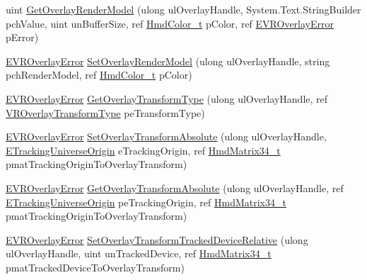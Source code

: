 \begin{DoxyCompactItemize}
\item 
uint \mbox{\hyperlink{class_valve_1_1_v_r_1_1_c_v_r_overlay_a71e8c48ef4e3a00ce3dd2795806407e3}{Get\+Overlay\+Render\+Model}} (ulong ul\+Overlay\+Handle, System.\+Text.\+String\+Builder pch\+Value, uint un\+Buffer\+Size, ref \mbox{\hyperlink{struct_valve_1_1_v_r_1_1_hmd_color__t}{Hmd\+Color\+\_\+t}} p\+Color, ref \mbox{\hyperlink{namespace_valve_1_1_v_r_aaee5c5144f42b7969d45b854f51b0c18}{E\+V\+R\+Overlay\+Error}} p\+Error)
\item 
\mbox{\hyperlink{namespace_valve_1_1_v_r_aaee5c5144f42b7969d45b854f51b0c18}{E\+V\+R\+Overlay\+Error}} \mbox{\hyperlink{class_valve_1_1_v_r_1_1_c_v_r_overlay_a6bb90e328dc2817d2c27f697c7f8e2bc}{Set\+Overlay\+Render\+Model}} (ulong ul\+Overlay\+Handle, string pch\+Render\+Model, ref \mbox{\hyperlink{struct_valve_1_1_v_r_1_1_hmd_color__t}{Hmd\+Color\+\_\+t}} p\+Color)
\item 
\mbox{\hyperlink{namespace_valve_1_1_v_r_aaee5c5144f42b7969d45b854f51b0c18}{E\+V\+R\+Overlay\+Error}} \mbox{\hyperlink{class_valve_1_1_v_r_1_1_c_v_r_overlay_aa02ca92f757e30beca7ac9ded8f6472a}{Get\+Overlay\+Transform\+Type}} (ulong ul\+Overlay\+Handle, ref \mbox{\hyperlink{namespace_valve_1_1_v_r_a92803c040c9ae49e1263b22b4d57d5fb}{V\+R\+Overlay\+Transform\+Type}} pe\+Transform\+Type)
\item 
\mbox{\hyperlink{namespace_valve_1_1_v_r_aaee5c5144f42b7969d45b854f51b0c18}{E\+V\+R\+Overlay\+Error}} \mbox{\hyperlink{class_valve_1_1_v_r_1_1_c_v_r_overlay_a8a03e164747126f2bd2bf28b5f0f1775}{Set\+Overlay\+Transform\+Absolute}} (ulong ul\+Overlay\+Handle, \mbox{\hyperlink{namespace_valve_1_1_v_r_a29be99a3c2f780157bd490db06a7f12f}{E\+Tracking\+Universe\+Origin}} e\+Tracking\+Origin, ref \mbox{\hyperlink{struct_valve_1_1_v_r_1_1_hmd_matrix34__t}{Hmd\+Matrix34\+\_\+t}} pmat\+Tracking\+Origin\+To\+Overlay\+Transform)
\item 
\mbox{\hyperlink{namespace_valve_1_1_v_r_aaee5c5144f42b7969d45b854f51b0c18}{E\+V\+R\+Overlay\+Error}} \mbox{\hyperlink{class_valve_1_1_v_r_1_1_c_v_r_overlay_a5108e385210ae62c370ceecbe62f6aae}{Get\+Overlay\+Transform\+Absolute}} (ulong ul\+Overlay\+Handle, ref \mbox{\hyperlink{namespace_valve_1_1_v_r_a29be99a3c2f780157bd490db06a7f12f}{E\+Tracking\+Universe\+Origin}} pe\+Tracking\+Origin, ref \mbox{\hyperlink{struct_valve_1_1_v_r_1_1_hmd_matrix34__t}{Hmd\+Matrix34\+\_\+t}} pmat\+Tracking\+Origin\+To\+Overlay\+Transform)
\item 
\mbox{\hyperlink{namespace_valve_1_1_v_r_aaee5c5144f42b7969d45b854f51b0c18}{E\+V\+R\+Overlay\+Error}} \mbox{\hyperlink{class_valve_1_1_v_r_1_1_c_v_r_overlay_aa959512be1624a75d9e44db50e20dcb3}{Set\+Overlay\+Transform\+Tracked\+Device\+Relative}} (ulong ul\+Overlay\+Handle, uint un\+Tracked\+Device, ref \mbox{\hyperlink{struct_valve_1_1_v_r_1_1_hmd_matrix34__t}{Hmd\+Matrix34\+\_\+t}} pmat\+Tracked\+Device\+To\+Overlay\+Transform)

\end{DoxyCompactItemize}
